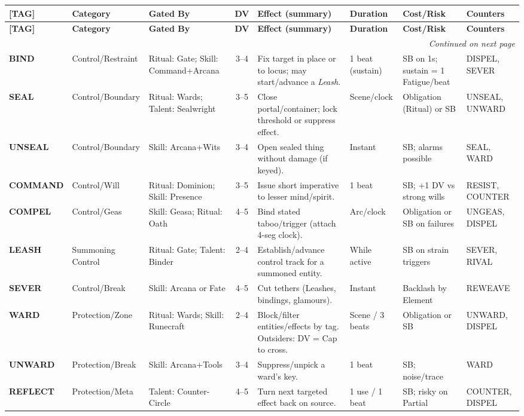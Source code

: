 \small
\begin{longtable}{@{} l l p{4.2cm} c p{6.5cm} p{2.2cm} p{3.2cm} p{2.2cm} @{}}%
\toprule
\textbf{[TAG]} & \textbf{Category} & \textbf{Gated By} & \textbf{DV} & \textbf{Effect (summary)} & \textbf{Duration} & \textbf{Cost/Risk} & \textbf{Counters} \\
\midrule
\endfirsthead
\toprule
\textbf{[TAG]} & \textbf{Category} & \textbf{Gated By} & \textbf{DV} & \textbf{Effect (summary)} & \textbf{Duration} & \textbf{Cost/Risk} & \textbf{Counters} \\
\midrule
\endhead
\midrule
\multicolumn{8}{r}{\emph{Continued on next page}}\\
\endfoot
\bottomrule
\endlastfoot

\textbf{BIND}      & Control/Restraint & Ritual: Gate; Skill: Command+Arcana & 3--4 & Fix target in place or to locus; may start/advance a \emph{Leash}. & 1 beat (sustain) & SB on 1s; sustain = 1 Fatigue/beat & DISPEL, SEVER \\
\textbf{SEAL}      & Control/Boundary  & Ritual: Wards; Talent: Sealwright   & 3--5 & Close portal/container; lock threshold or suppress effect. & Scene/clock & Obligation (Ritual) or SB & UNSEAL, UNWARD \\
\textbf{UNSEAL}    & Control/Boundary  & Skill: Arcana+Wits                   & 3--4 & Open sealed thing without damage (if keyed). & Instant & SB; alarms possible & SEAL, WARD \\
\textbf{COMMAND}   & Control/Will      & Ritual: Dominion; Skill: Presence    & 3--5 & Issue short imperative to lesser mind/spirit. & 1 beat & SB; +1 DV vs strong wills & RESIST, COUNTER \\
\textbf{COMPEL}    & Control/Geas      & Skill: Geasa; Ritual: Oath           & 4--5 & Bind stated taboo/trigger (attach 4-seg clock). & Arc/clock & Obligation or SB on failures & UNGEAS, DISPEL \\
\textbf{LEASH}     & Summoning Control & Ritual: Gate; Talent: Binder         & 2--4 & Establish/advance control track for a summoned entity. & While active & SB on strain triggers & SEVER, RIVAL \\
\textbf{SEVER}     & Control/Break     & Skill: Arcana or Fate                & 4--5 & Cut tethers (Leashes, bindings, glamours). & Instant & Backlash by Element & REWEAVE \\
\textbf{WARD}      & Protection/Zone   & Ritual: Wards; Skill: Runecraft      & 2--4 & Block/filter entities/effects by tag. Outsiders: DV = Cap to cross. & Scene / 3 beats & Obligation or SB & UNWARD, DISPEL \\
\textbf{UNWARD}    & Protection/Break  & Skill: Arcana+Tools                  & 3--4 & Suppress/unpick a ward’s key. & 1 beat & SB; noise/trace & WARD \\
\textbf{REFLECT}   & Protection/Meta   & Talent: Counter-Circle               & 4--5 & Turn next targeted effect back on source. & 1 use / 1 beat & SB; risky on Partial & COUNTER, DISPEL \\


\end{longtable}
